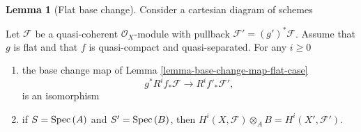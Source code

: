 \documentclass[11pt]{amsart}
\newcommand{\Spec}{{\rm Spec \,}}
\theoremstyle{definition}
\newtheorem{lemma}[theorem]{Lemma}
\begin{document}
\begin{lemma}[Flat base change]\cite[Tag 02KH]{stacks-project}
	\label{lemma-flat-base-change-cohomology}
	Consider a cartesian diagram of schemes
	\begin{center}
	\end{center}
	Let $\mathcal{F}$ be a quasi-coherent $\mathcal{O}_X$-module
	with pullback $\mathcal{F}' = (g')^*\mathcal{F}$.
	Assume that $g$ is flat and that $f$ is quasi-compact and quasi-separated.
	For any $i \geq 0$
	\begin{enumerate}
		\item the base change map of Lemma \ref{lemma-base-change-map-flat-case}
		$$
		g^*R^if_*\mathcal{F} \longrightarrow R^if'_*\mathcal{F}',
		$$
		is an isomorphism
		\item if $S = \Spec(A)$ and $S' = \Spec(B)$, then
		$H^i(X, \mathcal{F}) \otimes_A B = H^i(X', \mathcal{F}')$.
	\end{enumerate}
\end{lemma}
\end{document}

